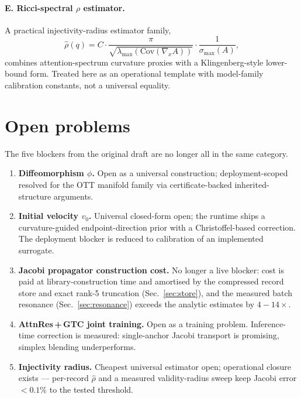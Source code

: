 \documentclass[11pt]{article}
\begin{document}
\paragraph{E. Ricci-spectral $\rho$ estimator.} A practical injectivity-radius
estimator family,
\begin{equation}
\hat\rho(q) = C\cdot\frac{\pi}{\sqrt{\lambda_{\max}(\mathrm{Cov}(\nabla_x A))}}\cdot
\frac{1}{\sigma_{\max}(A)},
\end{equation}
combines attention-spectrum curvature proxies with a Klingenberg-style
lower-bound form. Treated here as an operational template with model-family
calibration constants, not a universal equality.

\section{Open problems}

The five blockers from the original draft are no longer all in the same
category.

\begin{enumerate}
  \item \textbf{Diffeomorphism $\phi$.} Open as a universal construction;
        deployment-scoped resolved for the OTT manifold family via
        certificate-backed inherited-structure arguments.
  \item \textbf{Initial velocity $v_0$.} Universal closed-form open; the
        runtime ships a curvature-guided endpoint-direction prior with a
        Christoffel-based correction. The deployment blocker is reduced to
        calibration of an implemented surrogate.
  \item \textbf{Jacobi propagator construction cost.} No longer a live blocker:
        cost is paid at library-construction time and amortised by the
        compressed record store and exact rank-5 truncation
        (Sec.~\ref{sec:store}), and the measured batch resonance
        (Sec.~\ref{sec:resonance}) exceeds the analytic estimates by
        $4\!-\!14\times$.
  \item \textbf{AttnRes\,+\,GTC joint training.} Open as a training problem.
        Inference-time correction is measured: single-anchor Jacobi transport
        is promising, simplex blending underperforms.
  \item \textbf{Injectivity radius.} Cheapest universal estimator open;
        operational closure exists --- per-record $\hat\rho$ and a measured
        validity-radius sweep keep Jacobi error $<0.1\%$ to the tested
        threshold.
\end{enumerate}
\end{document}
